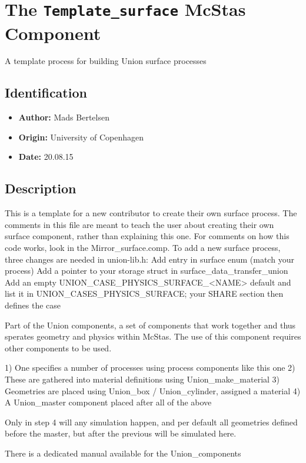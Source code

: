 \section{The \texttt{Template\_surface} McStas Component}
A template process for building Union surface processes

\subsection*{Identification}
\begin{itemize}
  \item \textbf{Author:} Mads Bertelsen
  \item \textbf{Origin:} University of Copenhagen
  \item \textbf{Date:} 20.08.15
\end{itemize}

\subsection*{Description}
This is a template for a new contributor to create their own surface process. The comments in this file are meant to teach the user about creating their own surface component, rather than explaining this one. For comments on how this code works, look in the Mirror\_surface.comp. To add a new surface process, three changes are needed in union-lib.h: Add entry in surface enum (match your process) Add a pointer to your storage struct in surface\_data\_transfer\_union Add an empty UNION\_CASE\_PHYSICS\_SURFACE\_\textless{}NAME\textgreater{} default and list it in UNION\_CASES\_PHYSICS\_SURFACE; your SHARE section then defines the case

Part of the Union components, a set of components that work together and thus sperates geometry and physics within McStas. The use of this component requires other components to be used.

1) One specifies a number of processes using process components like this one 2) These are gathered into material definitions using Union\_make\_material 3) Geometries are placed using Union\_box / Union\_cylinder, assigned a material 4) A Union\_master component placed after all of the above

Only in step 4 will any simulation happen, and per default all geometries defined before the master, but after the previous will be simulated here.

There is a dedicated manual available for the Union\_components

